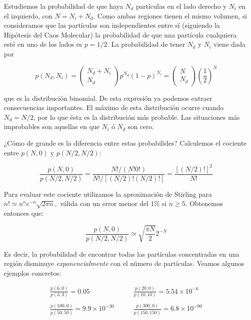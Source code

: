\documentclass[11pt, a4paper]{article} %
\theoremstyle{named}
\begin{document}
Estudiemos la probabilidad de que haya $N_d$ partículas en el lado derecho y $N_i$ en el izquierdo, con $N = N_i + N_d$. Como ambas regiones tienen el mismo volumen, si consideramos que las partículas son independientes entre sí (siguiendo la Hipótesis del Caos Molecular) la probabilidad de que una partícula cualquiera esté en uno de los lados es $p={1/2}$. La probabilidad de tener $N_d$ y $N_i$ viene dada por

\begin{equation}\label{eq:gasBinom}
p\left(N_{d}, N_{i}\right)=\left(\begin{array}{c}
{N_{d}+N_{i}} \\
{N_{d}}
\end{array}\right) p^{N_{d}}(1-p)^{N_{i}}=\left(\begin{array}{c}
{N} \\
{N_{d}}
\end{array}\right)\left(\frac{1}{2}\right)^{N}
\end{equation}

que es la distribución binomial. De esta expresión ya podemos extraer consecuencias importantes. El máximo de esta distribución ocurre cuando $N_d = N/2$, por lo que ésta es la distribución más probable. Las situaciones más improbables son aquellas en que $N_i$ ó $N_d$ son cero.

¿Cómo de grande es la diferencia entre estas probabilides? Calculemos el cociente entre $p(N, 0)$ y $p(N / 2, N / 2)$:

\begin{equation}
\frac{p(N, 0)}{p(N / 2, N / 2)}=\frac{N ! /(N ! 0 !)}{N ! /[(N / 2) !(N / 2) !]}=\frac{[(N / 2) !]^{2}}{N !}
\end{equation}

Para evaluar este cociente utilizamos la aproximación de Stirling para $n ! \simeq n^{n} e^{-n} \sqrt{2 \pi n},$ válida con un error menor del 1\% si $n \geq 5$. Obtenemos entonces que:

\begin{equation}
\frac{p(N, 0)}{p(N / 2, N / 2)} \simeq \sqrt{\frac{\pi N}{2}} 2^{-N}
\end{equation}

Es decir, la probabilidad de encontrar todas las partículas concentradas en una región disminuye \textit{exponencialmente} con el número de partículas. Veamos algunos ejemplos concretos:

$$
\begin{array}{lr}
\frac{p(6,0)}{p(3,3)} = 0.05 \qquad &
\frac{p(20,0)}{p(10,10)} = 5.54\times10^{-6} \\ \\
\frac{p(100,0)}{p(50,50)} = 9.9\times10^{-30} \qquad &
\frac{p(300,0)}{p(150,150)} = 6.8\times10^{-90}
\end{array}
$$
\end{document}
